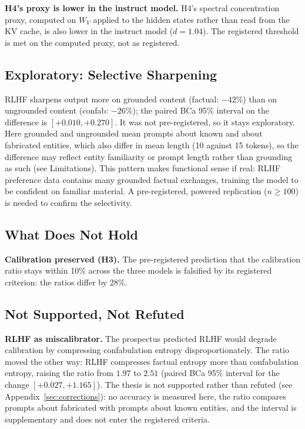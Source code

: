 \documentclass[11pt,a4paper]{article}
\begin{document}
\textbf{H4's proxy is lower in the instruct model.} H4's spectral
concentration proxy, computed on $W_V$ applied to the hidden states
rather than read from the KV cache, is also lower in the instruct
model ($d = 1.04$). The registered threshold is met on the computed
proxy, not as registered.

\subsection{Exploratory: Selective Sharpening}

RLHF sharpens output more on grounded content (factual: $-42\%$)
than on ungrounded content (confab: $-26\%$); the paired BCa 95\%
interval on the difference is $[+0.010, +0.270]$. It was not
pre-registered, so it stays exploratory. Here grounded and ungrounded
mean prompts about known and about fabricated entities, which also
differ in mean length (10 against 15 tokens), so the difference may
reflect entity familiarity or prompt length rather than grounding as
such (see Limitations). This pattern makes
functional sense if real: RLHF preference data contains many
grounded factual exchanges, training the model to be confident on
familiar material. A pre-registered, powered replication
($n{\geq}100$) is needed to confirm the selectivity.

\subsection{What Does Not Hold}

\textbf{Calibration preserved (H3).} The pre-registered prediction
that the calibration ratio stays within 10\% across the three models
is falsified by its registered criterion: the ratios differ by 28\%.

\subsection{Not Supported, Not Refuted}

\textbf{RLHF as miscalibrator.} The prospectus predicted RLHF would
degrade calibration by compressing confabulation entropy
disproportionately. The ratio moved the other way: RLHF compresses
factual entropy more than confabulation entropy, raising the ratio from
$1.97$ to $2.51$ (paired BCa 95\% interval for the change
$[+0.027, +1.165]$). The thesis is not supported rather than refuted
(see Appendix~\ref{sec:corrections}): no accuracy is measured here, the ratio compares prompts about
fabricated with prompts about known entities, and the interval is
supplementary and does not enter the registered criteria.
\end{document}
